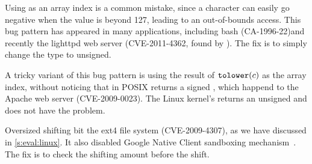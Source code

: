 Using  as an array index is a common mistake, since a
character can easily go negative when the value is beyond 127,
leading to an out-of-bounds access.  This bug pattern has appeared
in many applications, including bash (CA-1996-22)and recently the lighttpd
web server (CVE-2011-4362, found by
\sys).  The fix is to simply change the type to unsigned.

A tricky variant of this bug pattern is using the result of
$\texttt{tolower}(c)$ as the array index, without noticing that in POSIX
 returns a signed , which happend to the Apache
web server (CVE-2009-0023).  The Linux kernel's  returns
an unsigned  and does not have the problem.

Oversized shifting bit the ext4 file system (CVE-2009-4307),
as we have discussed in \autoref{s:eval:linux}.
It also disabled Google Native Client sandboxing mechanism~\cite{nacl}.
The fix is to check the shifting amount before the shift.

